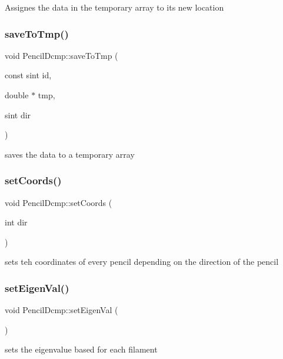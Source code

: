 Assignes the data in the temporary array to its new location \mbox{\label{classPencilDcmp_a59feaa65591c690a68a52fe98ad9da8b}} 
\subsubsection{\texorpdfstring{save\+To\+Tmp()}{saveToTmp()}}
{\footnotesize\ttfamily void Pencil\+Dcmp\+::save\+To\+Tmp (\begin{DoxyParamCaption}\item[{const sint}]{id,  }\item[{double $\ast$}]{tmp,  }\item[{sint}]{dir }\end{DoxyParamCaption})}

saves the data to a temporary array \mbox{\label{classPencilDcmp_a885fa996b7c6a9a0b63e046937da5bcb}} 
\subsubsection{\texorpdfstring{set\+Coords()}{setCoords()}}
{\footnotesize\ttfamily void Pencil\+Dcmp\+::set\+Coords (\begin{DoxyParamCaption}\item[{int}]{dir }\end{DoxyParamCaption})}

sets teh coordinates of every pencil depending on the direction of the pencil \mbox{\label{classPencilDcmp_aac2a7354c9e629510b8de6f96921788b}} 
\subsubsection{\texorpdfstring{set\+Eigen\+Val()}{setEigenVal()}}
{\footnotesize\ttfamily void Pencil\+Dcmp\+::set\+Eigen\+Val (\begin{DoxyParamCaption}{ }\end{DoxyParamCaption})}

sets the eigenvalue based for each filament \mbox{\label{classPencilDcmp_a8ea122a3a5c4f6481fce20d8ac8e87f6}} 

